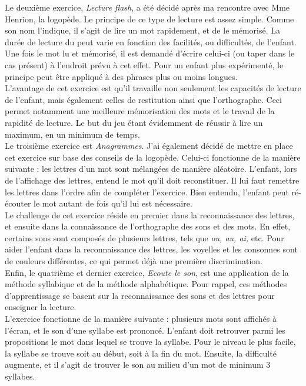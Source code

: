 Le deuxième exercice, \textit{Lecture flash}, a été décidé après ma rencontre avec Mme Henrion, la logopède. Le principe de ce type de lecture est assez simple. Comme son nom l'indique, il s'agit de lire un mot rapidement, et de le mémorisé. La durée de lecture du peut varie en fonction des facilités, ou difficultés, de l'enfant. Une fois le mot lu et mémorisé, il est demandé d'écrire celui-ci (ou taper dans le cas présent) à l'endroit prévu à cet effet. Pour un enfant plus expérimenté, le principe peut être appliqué à des phrases plus ou moins longues.\\

L'avantage de cet exercice est qu'il travaille non seulement les capacités de lecture de l'enfant, mais également celles de restitution ainsi que l'orthographe. Ceci permet notamment une meilleure mémorisation des mots et le travail de la rapidité de lecture. Le but du jeu étant évidemment de réussir à lire un maximum, en un minimum de temps. \\

Le troisième exercice est \textit{Anagrammes}. J'ai également décidé de mettre en place cet exercice sur base des conseils de la logopède. Celui-ci fonctionne de la manière suivante : les lettres d'un mot sont mélangées de manière aléatoire. L'enfant, lors de l'affichage des lettres, entend le mot qu'il doit reconstituer. Il lui faut remettre les lettres dans l'ordre afin de compléter l'exercice. Bien entendu, l'enfant peut ré-écouter le mot autant de fois qu'il lui est nécessaire.\\

Le challenge de cet exercice réside en premier dans la reconnaissance des lettres, et ensuite dans la connaissance de l'orthographe des sons et des mots. En effet, certains sons sont composés de plusieurs lettres, tels que \textit{ou, au, ai,} etc. Pour aider l'enfant dans la reconnaissance des lettres, les voyelles et les consonnes sont de couleurs différentes, ce qui permet déjà une première discrimination.\\

Enfin, le quatrième et dernier exercice, \textit{Ecoute le son}, est une application de la méthode syllabique et de la méthode alphabétique. Pour rappel, ces méthodes d'apprentissage se basent sur la reconnaissance des sons et des lettres pour enseigner la lecture.\\

L'exercice fonctionne de la manière suivante : plusieurs mots sont affichés à l'écran, et le son d'une syllabe est prononcé. L'enfant doit retrouver parmi les propositions le mot dans lequel se trouve la syllabe. Pour le niveau le plus facile, la syllabe se trouve soit au début, soit à la fin du mot. Ensuite, la difficulté augmente, et il s'agit de trouver le son au milieu d'un mot de minimum 3 syllabes.\\

